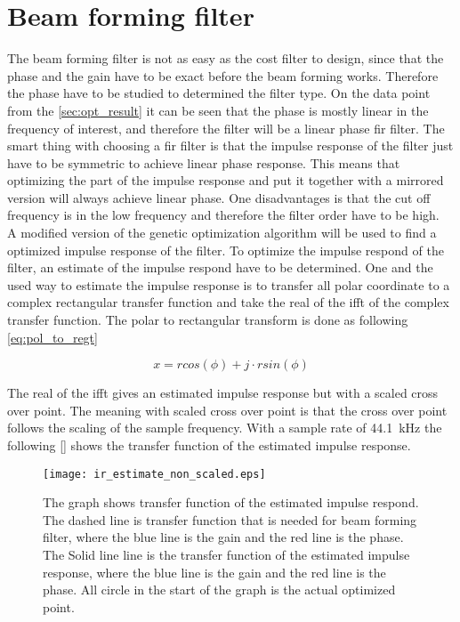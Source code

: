 \section{Beam forming filter}
The beam forming filter is not as easy as the cost filter to design, since that the phase and the gain have to be exact before the beam forming works. Therefore the phase have to be studied to determined the filter type. On the data point from the \ref{sec:opt_result} it can be seen that the phase is mostly linear in the frequency of interest, and therefore the filter will be a linear phase \gls{fir} filter. The smart thing with choosing a \gls{fir} filter is that the impulse response of the filter just have to be symmetric to achieve linear phase response. This means that optimizing the part of the impulse response and put it together with a mirrored version will always achieve linear phase. One disadvantages is that the cut off frequency is in the low frequency and therefore the filter order have to be high. \\

 A modified version of the genetic optimization algorithm will be used to find a optimized impulse response of the filter. To optimize the impulse respond of the filter, an estimate of the impulse respond have to be determined. One and the used way to estimate the impulse response is to transfer all polar coordinate to a complex rectangular transfer function and take the real of the \gls{ifft} of the complex transfer function. The polar to rectangular transform is done as following \autoref{eq:pol_to_regt}

\begin{equation}\label{eq:pol_to_regt}
x=rcos(\phi)+j \cdot rsin(\phi)
\end{equation}


     \startexplain
    \stopexplain

The real of the \gls{ifft} gives an estimated impulse response but with a scaled cross over point. The meaning with scaled cross over point is that the cross over point follows the scaling of the sample frequency. With a sample rate of \SI{44.1}{\kilo\hertz} the following  \autoref{} shows the transfer function of the estimated impulse response. 

\begin{figure}[H]
	\centering
	\texttt{[image: ir\_estimate\_non\_scaled.eps]}
	\caption{The graph shows transfer function of the estimated impulse respond. The dashed line is transfer function that is needed for beam forming filter, where the blue line is the gain and the red line is the phase. The Solid line line is the transfer function of the estimated impulse response, where the blue line is the gain and the red line is the phase. All circle in the start of the graph is the actual optimized point.}
		\label{fig:ir_estimate_non_scaled}
\end{figure}



